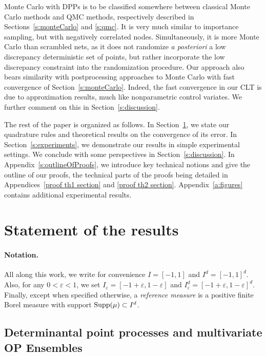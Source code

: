 \documentclass[a4paper,11pt]{article}
\numberwithin{equation}{section}
\theoremstyle{definition}
\newcommand{\rev}[1]{#1}
\newcommand{\Supp}{{\rm Supp}}
\renewcommand{\epsilon}{\varepsilon}
\begin{document}
Monte Carlo with DPPs is to be classified somewhere between classical Monte Carlo
methods and QMC methods, respectively described in Sections~\ref{s:monteCarlo}
and \ref{s:qmc}. It is very much similar to importance sampling, but with
negatively correlated nodes. Simultaneously, it is more Monte Carlo than
scrambled nets, as it does not randomize \emph{a posteriori} a low discrepancy
deterministic set of points, but rather incorporate the low discrepancy constraint
into the randomization procedure. Our approach also bears similarity with postprocessing approaches to Monte Carlo with fast convergence of Section~\ref{s:monteCarlo}. Indeed, the fast convergence in our CLT is due to approximation results, much like nonparametric control variates. We further comment on this in Section~\ref{s:discussion}.

The rest of the paper is organized as follows. In Section~\ref{s:results}, we
state our quadrature rules and theoretical results on the convergence of its
error. In Section~\ref{s:experiments}, we demonstrate our results in simple
experimental settings. We conclude with some
perspectives in Section~\ref{s:discussion}. In Appendix~\ref{s:outlineOfProofs}, we introduce key technical notions and give the outline of our proofs, the technical parts of the proofs being detailed in Appendices~\ref{proof th1 section} and \ref{proof th2 section}. Appendix~\ref{a:figures} contains additional experimental results.


\section{Statement of the results}
\label{s:results}

\paragraph{Notation.}
All along this work, we write for convenience $I=[-1,1]$ and $ I^d=[-1,1]^d$.
Also, for any $0<\epsilon<1$, we set  $I_\epsilon=[-1+\epsilon,1-\epsilon]$ and
$I_\epsilon^d=[-1+\epsilon,1-\epsilon]^d$. Finally, except when specified
otherwise, a \emph{reference measure} is a positive finite Borel measure with support  \rev{ $\Supp(\mu)\subset I^d$}.


\subsection{Determinantal point processes and multivariate OP Ensembles}
\end{document}
